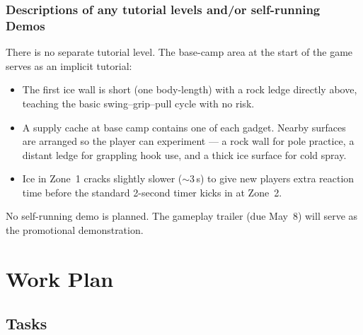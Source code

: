 \documentclass[12pt]{article}
\begin{document}
\subsubsection{Descriptions of any tutorial levels and/or self-running Demos}

There is no separate tutorial level. The base-camp area at the start of the game serves as an implicit tutorial:

\begin{itemize}[leftmargin=2em]
    \item The first ice wall is short (one body-length) with a rock ledge directly above, teaching the basic swing--grip--pull cycle with no risk.
    \item A supply cache at base camp contains one of each gadget. Nearby surfaces are arranged so the player can experiment --- a rock wall for pole practice, a distant ledge for grappling hook use, and a thick ice surface for cold spray.
    \item Ice in Zone~1 cracks slightly slower ($\sim$3\,s) to give new players extra reaction time before the standard 2-second timer kicks in at Zone~2.
\end{itemize}

No self-running demo is planned. The gameplay trailer (due May~8) will serve as the promotional demonstration.

\newpage

\section{Work Plan}

\subsection{Tasks}
\end{document}
